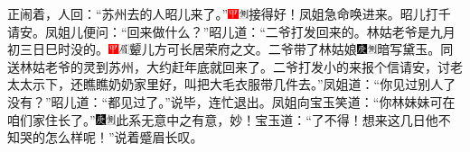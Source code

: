 正闹着，人回：“苏州去的人昭儿来了。”{\includegraphics[width=3mm]{../Images/00002}\includegraphics[width=3mm]{../Images/00011}\footnotesize \kaishu 接得好！}凤姐急命唤进来。昭儿打千请安。凤姐儿便问：“回来做什么？”昭儿道：“二爷打发回来的。林姑老爷是九月初三日巳时没的。{\includegraphics[width=3mm]{../Images/00002}\includegraphics[width=3mm]{../Images/00010}\footnotesize \kaishu 颦儿方可长居荣府之文。}二爷带了林姑娘{\includegraphics[width=3mm]{../Images/00004}\includegraphics[width=3mm]{../Images/00011}\footnotesize \kaishu 暗写黛玉。}同送林姑老爷的灵到苏州，大约赶年底就回来了。二爷打发小的来报个信请安，讨老太太示下，还瞧瞧奶奶家里好，叫把大毛衣服带几件去。”凤姐道：“你见过别人了没有？”昭儿道：“都见过了。”说毕，连忙退出。凤姐向宝玉笑道：“你林妹妹可在咱们家住长了。”{\includegraphics[width=3mm]{../Images/00004}\includegraphics[width=3mm]{../Images/00011}\footnotesize \kaishu 此系无意中之有意，妙！}宝玉道：“了不得！想来这几日他不知哭的怎么样呢！”说着蹙眉长叹。

